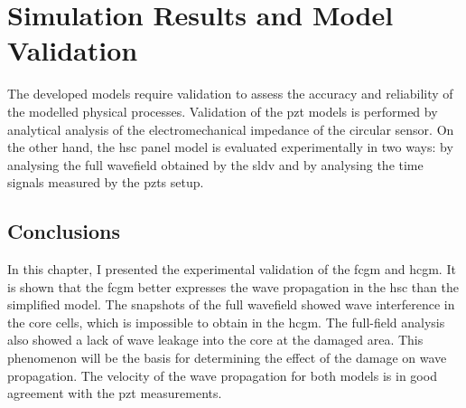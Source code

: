 
\chapter[Simulation Results and Model Validation]{Simulation Results and Model Validation}
\label{ch:validation}

The developed models require validation to assess the accuracy and reliability of the modelled physical processes.
Validation of the \ac{pzt} models is performed by analytical analysis of the electromechanical impedance of the circular sensor. 
On the other hand, the \ac{hsc} panel model is evaluated experimentally in two ways: by analysing the full wavefield obtained by the \ac{sldv} and by analysing the time signals measured by the \acp{pzt} setup.





\section{Conclusions}
\label{sec:conclusionsValid}

In this chapter, I presented the experimental validation of the \ac{fcgm} and \ac{hcgm}.
It is shown that the \ac{fcgm} better expresses the wave propagation in the \ac{hsc} than the simplified model.
The snapshots of the full wavefield showed wave interference in the core cells, which is impossible to obtain in the \ac{hcgm}.
The full-field analysis also showed a lack of wave leakage into the core at the damaged area.
This phenomenon will be the basis for determining the effect of the damage on wave propagation.
The velocity of the wave propagation for both models is in good agreement with the \ac{pzt} measurements.